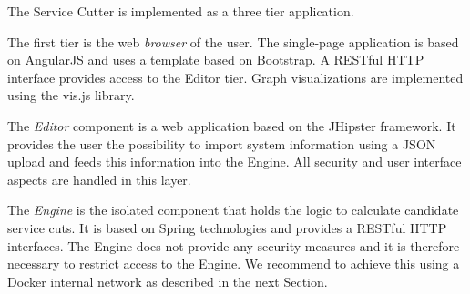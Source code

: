 \begin{minipage}[t]{0.5\textwidth}
\setlength{\parskip}{5pt plus 0.1pt}
	The Service Cutter is implemented as a three tier application.
	
	The first tier is the web \textit{browser} of the user. The single-page application is based on AngularJS\cite{angularjs} and uses a template based on Bootstrap\cite{bootstrap}. A RESTful HTTP interface provides access to the Editor tier. Graph visualizations are implemented using the vis.js library\cite{visjs}.
	
	The \textit{Editor} component is a web application based on the JHipster\cite{jhipster} framework. It provides the user the possibility to import system information using a JSON upload and feeds this information into the Engine. All security and user interface aspects are handled in this layer.
	
	The \textit{Engine} is the isolated component that holds the logic to calculate candidate service cuts. It is based on Spring technologies and provides a RESTful HTTP interfaces. The Engine does not provide any security measures and it is therefore necessary to restrict access to the Engine. We recommend to achieve this using a Docker\cite{docker} internal network as described in the next Section.
	
\end{minipage}
